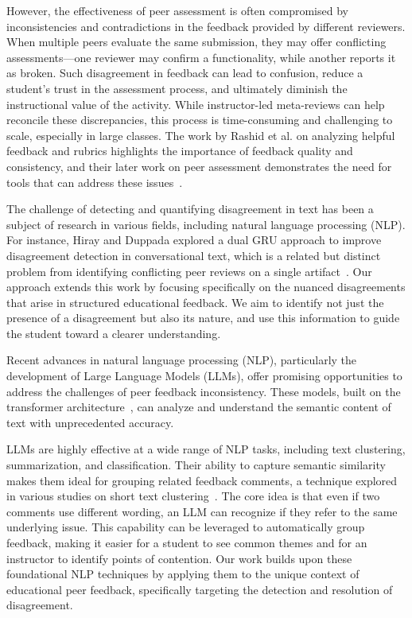 \documentclass[manuscript,review, anonymous]{acmart}
\begin{document}
However, the effectiveness of peer assessment is often compromised by inconsistencies and contradictions in the feedback provided by different reviewers. When multiple peers evaluate the same submission, they may offer conflicting assessments—one reviewer may confirm a functionality, while another reports it as broken. Such disagreement in feedback can lead to confusion, reduce a student's trust in the assessment process, and ultimately diminish the instructional value of the activity. While instructor-led meta-reviews can help reconcile these discrepancies, this process is time-consuming and challenging to scale, especially in large classes. The work by Rashid et al. on analyzing helpful feedback and rubrics highlights the importance of feedback quality and consistency, and their later work on peer assessment demonstrates the need for tools that can address these issues~\cite{rashid2021peer, rashid2022going}.

The challenge of detecting and quantifying disagreement in text has been a subject of research in various fields, including natural language processing (NLP). For instance, Hiray and Duppada explored a dual GRU approach to improve disagreement detection in conversational text, which is a related but distinct problem from identifying conflicting peer reviews on a single artifact~\cite{hiray2017agree}. Our approach extends this work by focusing specifically on the nuanced disagreements that arise in structured educational feedback. We aim to identify not just the presence of a disagreement but also its nature, and use this information to guide the student toward a clearer understanding.

Recent advances in natural language processing (NLP), particularly the development of Large Language Models (LLMs), offer promising opportunities to address the challenges of peer feedback inconsistency. These models, built on the transformer architecture~\cite{vaswani2017attention, devlin2018bert}, can analyze and understand the semantic content of text with unprecedented accuracy.

LLMs are highly effective at a wide range of NLP tasks, including text clustering, summarization, and classification. Their ability to capture semantic similarity makes them ideal for grouping related feedback comments, a technique explored in various studies on short text clustering~\cite{jinarat2018short, guan2020deep}. The core idea is that even if two comments use different wording, an LLM can recognize if they refer to the same underlying issue. This capability can be leveraged to automatically group feedback, making it easier for a student to see common themes and for an instructor to identify points of contention. Our work builds upon these foundational NLP techniques by applying them to the unique context of educational peer feedback, specifically targeting the detection and resolution of disagreement.
\end{document}
